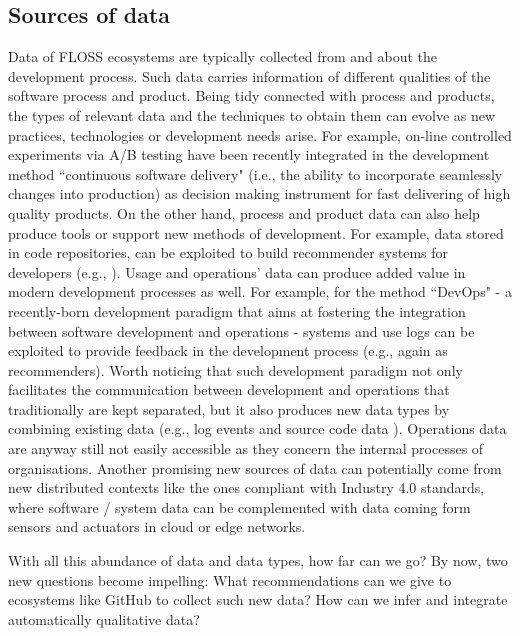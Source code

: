 \subsection{Sources of data}
Data of FLOSS ecosystems are typically collected from and about the development process. Such data carries information of different 
qualities of the software process and product. Being tidy connected with process and products, the types of relevant data and 
the techniques to obtain them can evolve as new practices, technologies or development needs arise. For example, on-line controlled 
experiments via A/B testing  have been recently integrated in the development method ``continuous software delivery" (i.e., the ability 
to incorporate seamlessly changes into production) as decision making instrument for fast delivering of high quality products. 
On the other hand, process and product data can also help produce tools or support new methods of development. For example, data 
stored in code repositories, can be exploited to build recommender systems for developers (e.g., \cite{VillaroelEtAl2016}).  
Usage and operations' data can produce added value in modern development processes as well.  For example, for the method ``DevOps" 
- a recently-born development paradigm that aims at fostering the integration between software development and operations 
- systems and use logs can be exploited to provide feedback in the development process (e.g., again as recommenders).
Worth noticing that such development paradigm not only facilitates the communication between development and operations that
traditionally are kept separated, but it also produces new data types by combining existing data (e.g., log events and source code data
 \cite{MeiNagappanPhDThesis}). Operations data are anyway still not easily accessible as they concern the internal processes of organisations.  
Another promising new sources of data can potentially come from new distributed contexts like the ones compliant with Industry 4.0
standards, where software / system data can be complemented with data coming form sensors and actuators in cloud or edge networks.   

With all this abundance of data and data types, how far can we go? By now, two new questions become impelling: What recommendations can we give to  ecosystems like GitHub to collect such new data? How can we infer and integrate automatically qualitative data?

